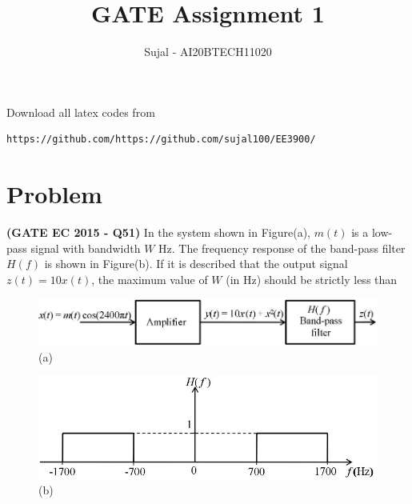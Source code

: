 \documentclass[journal,12pt,twocolumn]{IEEEtran}
\begin{document}
\let\StandardTheFigure\thefigure
\let\vec\mathbf
\renewcommand{\thefigure}{\theproblem}
\def\putbox#1#2#3{\makebox[0in][l]{\makebox[#1][l]{}\raisebox{\baselineskip}[0in][0in]{\raisebox{#2}[0in][0in]{#3}}}}
     \def\rightbox#1{\makebox[0in][r]{#1}}
     \def\centbox#1{\makebox[0in]{#1}}
     \def\topbox#1{\raisebox{-\baselineskip}[0in][0in]{#1}}
     \def\midbox#1{\raisebox{-0.5\baselineskip}[0in][0in]{#1}}
\vspace{3cm}
\title{GATE Assignment 1}
\author{Sujal - AI20BTECH11020}
\maketitle
\newpage
\bigskip
\renewcommand{\thefigure}{\theenumi}
\renewcommand{\thetable}{\theenumi}
Download all latex codes from 

\begin{lstlisting}
https://github.com/https://github.com/sujal100/EE3900/
\end{lstlisting}

\section{Problem}
\textbf{(GATE EC 2015 - Q51)} In the system shown in Figure(a), $m(t)$ is a low-pass signal with bandwidth $W$ Hz. The frequency response of the band-pass filter $H(f)$ is shown in Figure(b). If it is described that the output signal $z(t)=10x(t)$, the maximum value of $W$ (in Hz) should be strictly less than \underline{\hspace{2cm}}
\begin{figure}[!h]
\centering
\includegraphics[width=\columnwidth]{question_1.png}
\caption{(a)}
\end{figure}
\begin{figure}[!h]
\centering
\includegraphics[width=\columnwidth]{question_2.png}
\caption{(b)}
\end{figure}
\end{document}
